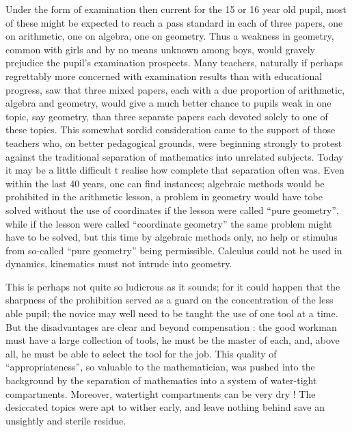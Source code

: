 Under the form of examination then current for the 15 or 16 year old pupil, most of these might be expected to reach a pass standard in each of three papers, one on arithmetic, one on algebra, one on geometry. Thus a weakness in geometry, common with girls and by no means unknown among boys, would gravely prejudice the pupil's examination prospects. Many teachers, naturally if perhaps regrettably more concerned with examination results than with educational progress, saw that three mixed papers, each with a due proportion of arithmetic, algebra and geometry, would give a much better chance to pupils weak in one topic, say geometry, than three separate papers each devoted solely to one of these topics. This somewhat sordid consideration came to the support of those teachers who, on better pedagogical grounds, were beginning strongly to protest against the traditional separation of mathematics into unrelated subjects. Today it may be a little difficult t realise how complete that separation often was. Even within the last 40 years, one can find instances; algebraic methods would be prohibited in the arithmetic lesson, a problem in geometry would have to\pageoriginale be solved without the use of coordinates if the lesson were called ``pure geometry'', while if the lesson were called ``coordinate geometry'' the same problem might have to be solved, but this time by algebraic methods only, no help or stimulus from so-called ``pure geometry'' being permissible. Calculus could not be used in dynamics, kinematics must not intrude into geometry.

This is perhaps not quite so ludicrous as it sounds; for it could happen that the  sharpness of the prohibition served as a guard on the concentration of the less able pupil; the novice may well need to be taught the use of one tool at a time. But the disadvantages are clear and beyond compensation : the good workman must have a large collection of tools, he must be the master of each, and, above all, he must be able to select the tool for the job. This quality of ``appropriateness'', so valuable to the mathematician, was pushed into the background by the separation of mathematics into a system of water-tight compartments. Moreover, watertight compartments can be very dry ! The desiccated topics were apt to wither early, and leave nothing behind save an unsightly and sterile residue.

